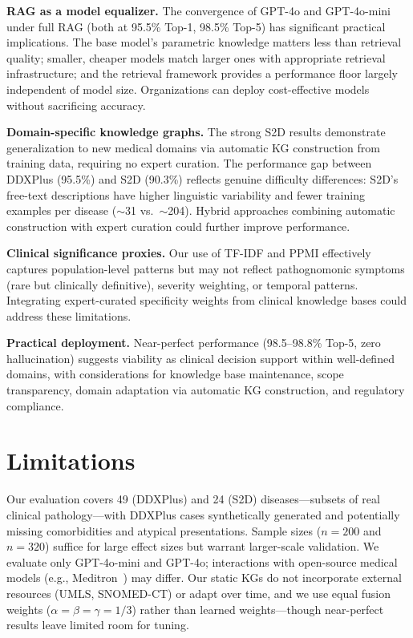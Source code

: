 \documentclass[preprint,12pt]{elsarticle}
\begin{document}
\textbf{RAG as a model equalizer.} The convergence of GPT-4o and GPT-4o-mini under full RAG (both at 95.5\% Top-1, 98.5\% Top-5) has significant practical implications. The base model's parametric knowledge matters less than retrieval quality; smaller, cheaper models match larger ones with appropriate retrieval infrastructure; and the retrieval framework provides a performance floor largely independent of model size. Organizations can deploy cost-effective models without sacrificing accuracy.

\textbf{Domain-specific knowledge graphs.} The strong S2D results demonstrate generalization to new medical domains via automatic KG construction from training data, requiring no expert curation. The performance gap between DDXPlus (95.5\%) and S2D (90.3\%) reflects genuine difficulty differences: S2D's free-text descriptions have higher linguistic variability and fewer training examples per disease (${\sim}$31 vs.\ ${\sim}$204). Hybrid approaches combining automatic construction with expert curation could further improve performance.

\textbf{Clinical significance proxies.} Our use of TF-IDF and PPMI effectively captures population-level patterns but may not reflect pathognomonic symptoms (rare but clinically definitive), severity weighting, or temporal patterns. Integrating expert-curated specificity weights from clinical knowledge bases could address these limitations.

\textbf{Practical deployment.} Near-perfect performance (98.5--98.8\% Top-5, zero hallucination) suggests viability as clinical decision support within well-defined domains, with considerations for knowledge base maintenance, scope transparency, domain adaptation via automatic KG construction, and regulatory compliance.

\section{Limitations}
\label{sec:limitations}

Our evaluation covers 49 (DDXPlus) and 24 (S2D) diseases---subsets of real clinical pathology---with DDXPlus cases synthetically generated and potentially missing comorbidities and atypical presentations. Sample sizes ($n{=}200$ and $n{=}320$) suffice for large effect sizes but warrant larger-scale validation. We evaluate only GPT-4o-mini and GPT-4o; interactions with open-source medical models (e.g., Meditron~\cite{chen2023meditron}) may differ. Our static KGs do not incorporate external resources (UMLS, SNOMED-CT) or adapt over time, and we use equal fusion weights ($\alpha{=}\beta{=}\gamma{=}1/3$) rather than learned weights---though near-perfect results leave limited room for tuning.
\end{document}
